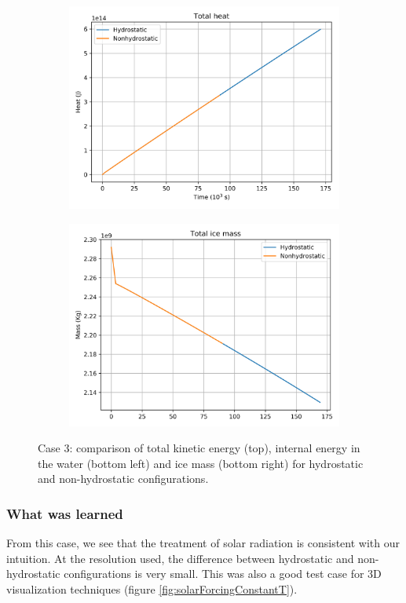 \documentclass[11pt]{article}
\begin{document}
\begin{figure}[h!]
\begin{subfigure}{0.49\linewidth}
\includegraphics[width=\linewidth]{solarForcing/convect-deltaQ}
\end{subfigure}
\begin{subfigure}{0.49\linewidth}
\includegraphics[width=\linewidth]{solarForcing/convect-deltaIce}
\end{subfigure}
\caption{Case 3: comparison of total kinetic energy (top), internal energy in the water (bottom left) and ice mass (bottom right) for hydrostatic and non-hydrostatic configurations.}
\label{fig:solarForcingCompare}
\end{figure}

\subsubsection{What was learned}
From this case, we see that the treatment of solar radiation is consistent with our intuition. At the resolution used, the difference between hydrostatic and non-hydrostatic configurations is very small. This was also a good test case for 3D visualization techniques (figure \ref{fig:solarForcingConstantT}).
\end{document}
